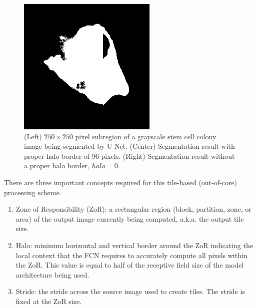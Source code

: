\documentclass[runningheads]{llncs}
\begin{document}
\begin{figure}
\begin{minipage}{0.32\columnwidth}
	\end{minipage}
	\begin{minipage}{0.32\columnwidth}
		\includegraphics[width=\columnwidth]{figs/no_halo.png}
	\end{minipage}
	\caption{(Left) $250 \times 250$ pixel subregion of a grayscale stem cell colony image being segmented by U-Net. (Center) Segmentation result with proper halo border of 96 pixels. (Right) Segmentation result without a proper halo border, $halo = 0$.} 
	\label{fig:nohalo}
\end{figure}

There are three important concepts required for this tile-based (out-of-core) processing scheme. 
\begin{enumerate}
	\item Zone of Responsibility (ZoR): a rectangular region (block, partition, zone, or area) of the output image currently being computed, a.k.a. the output tile size.
	\item Halo: minimum horizontal and vertical border around the ZoR indicating the local context that the FCN requires to accurately compute all pixels within the ZoR. This value is equal to half of the receptive field size of the model architecture being used. 
	\item Stride: the stride across the source image used to create tiles. The stride is fixed at the ZoR size.
\end{enumerate}
\end{document}
